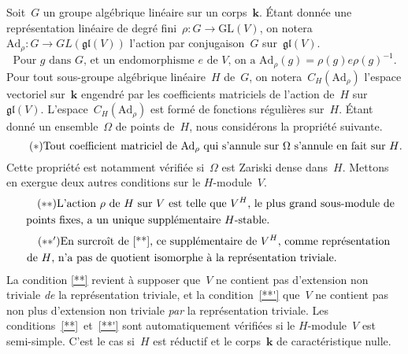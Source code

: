 \documentclass[french]{amsart}
\newcommand{\kk}{\mathbf{k}}
\newcommand{\GL}{\mathrm{GL}}
\newcommand{\Ad}{\mathrm{Ad}}
\newcommand{\lie}[1]{{\mathfrak{#1}}}
\newcommand{\gl}{\lie{gl}}
\begin{document}
Soit~$G$ un groupe algébrique linéaire sur un corps~$\kk$. Étant donnée une représentation linéaire de degré fini~$\rho : G \rightarrow \GL(V)$, on notera~$\Ad_\rho : G \rightarrow GL (\gl(V ))$ l'action par conjugaison~$G$ sur~$\gl(V)$.
\begin{equation}\label{eq1}
\text{Pour~$g$ dans~$G$, et un endomorphisme~$e$ de~$V$, on a~$\Ad_\rho(g)=\rho(g)e\rho(g)^{-1}$.}
\end{equation}
Pour tout sous-groupe algébrique linéaire~$H$ de~$G$, on notera~$C_H(\Ad_\rho)$ l'espace vectoriel sur~$\kk$ engendré par les coefficients matriciels de l'action de~$H$ sur~$\gl(V)$. L'espace~$C_H(\Ad_\rho)$ est formé de fonctions régulières sur~$H$. Étant donné un ensemble~$\Omega$ de points de~$H$, nous considérons la propriété suivante.
\begin{equation}\tag{\text{$\ast$}}\label{*}
\text{Tout coefficient matriciel de~$\Ad_\rho$ qui s'annule sur~$\Omega$ s'annule en fait sur~$H$.} 
\end{equation}
Cette propriété est notamment vérifiée si~$\Omega$ est Zariski dense dans~$H$. Mettons en exergue deux autres conditions sur le $H$-module~$V$.
\begin{multline}\tag{\text{$\ast\ast$}}\label{**}
	\text{L'action~$\rho$ de~$H$ sur~$V$ est telle que~$V^H$, le plus grand sous-module de}\\
	\shoveleft{\text{points fixes, a un unique supplémentaire $H$-stable.}}
\end{multline}
\begin{multline}\tag{\text{$\ast\ast^\prime$}}\label{**'}
	\text{En surcroît de~\eqref{**}, ce supplémentaire de~$V^H$, comme représentation }\\ \shoveleft{\text{de~$H$, n'a pas de quotient isomorphe à la représentation triviale.}}
\end{multline}
La condition \eqref{**} revient à supposer que~$V$ ne contient pas d'extension non triviale \emph{de} la représentation triviale, et la condition~\eqref{**'} que~$V$ ne contient pas non
plus d'extension non triviale \emph{par} la représentation triviale. Les conditions~\eqref{**}~et~\eqref{**'} sont automatiquement vérifiées si le $H$-module~$V$ est semi-simple. C'est le cas si~$H$ est réductif et le corps~$\kk$ de caractéristique nulle.
\end{document}
